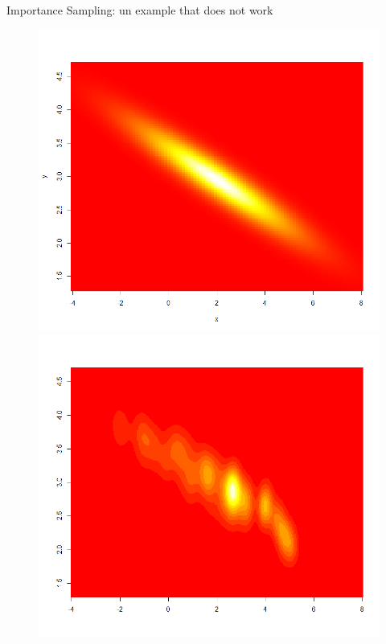  
\begin{frame}{Importance Sampling: un example that does not work}
\begin{figure}
   \begin{minipage}[c]{.46\linewidth}
 \includegraphics[width=\textwidth]{figures/post_2D_true.png}
   \end{minipage} \hfill
   \begin{minipage}[c]{.46\linewidth}
  \includegraphics[width=\textwidth]{figures/post_2D_IS_2.png}

\end{minipage}
\end{figure}
\end{frame}
